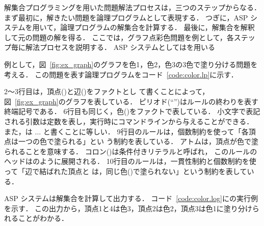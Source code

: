 


解集合プログラミングを用いた問題解法プロセスは，三つのステップからなる．
まず最初に，解きたい問題を論理プログラムとして表現する．
つぎに，ASP システムを用いて，論理プログラムの解集合を計算する．
最後に，解集合を解釈して元の問題の解を得る．
%
ここでは，グラフ点彩色問題を例として，各ステップ毎に解法プロセスを説明する．
ASP システムとしては{\clingo}を用いる

例として，図~\ref{fig:ex_graph}のグラフを色1，色2，色3の3色で塗り分ける問題を考える．
この問題を表す論理プログラムをコード~\ref{code:color.lp}に示す．

2〜3行目は，頂点()と辺()をファクトとし
て書くことによって，図~\ref{fig:ex_graph}のグラフを表している．
ピリオド(``'')はルールの終わりを表す終端記号である．
6行目も同じく，色()をファクトで表している．
小文字で表記される引数は定数を表し，{\clingo}実行時にコマンドラインから与えることができる．
また，は  $\ldots$ と書くことに等しい．
%
9行目のルールは，個数制約を使って「各頂点は一つの色で塗られる」とい
う制約を表している．
アトムは，頂点が色で塗られることを意味する．
コロン(\code{:})は条件付きリテラルと呼ばれ，
このルールのヘッドはのように展開される．
10行目のルールは，一貫性制約と個数制約を使って「辺で結ばれた頂点と
は，同じ色()で塗られない」という制約を表している．

ASP システムは解集合を計算して出力する．
コード~\ref{code:color.log}に{\clingo}の実行例を示す．
この出力から，頂点1と4は色3，頂点2は色2，頂点3は色1に塗り分けられることがわかる．


